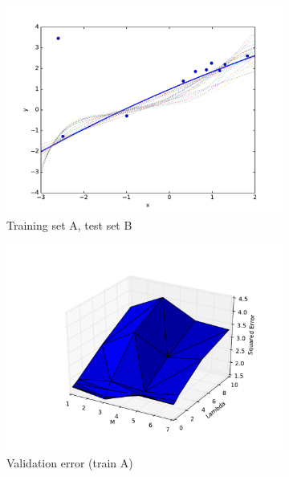 \documentclass[10pt,psamsfonts]{amsart}
\theoremstyle{definition}
\theoremstyle{remark}
\numberwithin{equation}{section}
\begin{document}
\begin{figure}
	\centering
	\begin{subfigure}[b]{0.24\textwidth}
		\includegraphics[width=\textwidth]{hw1_3-2_A.pdf}
		\caption{Training set A, test set B}
	\end{subfigure}
	\begin{subfigure}[b]{0.24\textwidth}
		\includegraphics[width=\textwidth]{hw1_3-2_A_err.pdf}
		\caption{Validation error (train A)}
	\end{subfigure}
	\begin{subfigure}[b]{0.24\textwidth}

\end{subfigure}
\end{figure}
\end{document}
